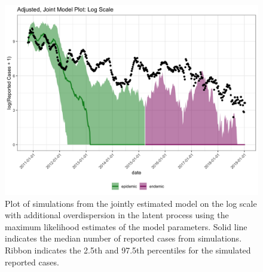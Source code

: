 \documentclass[12pt]{article}
\begin{document}
\begin{figure}[H]
  \centering
  \includegraphics[width=150mm]{mle_plot_joint_log.png}
  \caption{Plot of simulations from the jointly estimated model on the log scale with additional overdispersion in the latent process using the maximum likelihood estimates of the model parameters. Solid line indicates the median number of reported cases from simulations. Ribbon indicates the 2.5th and 97.5th percentiles for the simulated reported cases.}
  \label{fig:A6}
\end{figure}

\newpage


\end{document}
